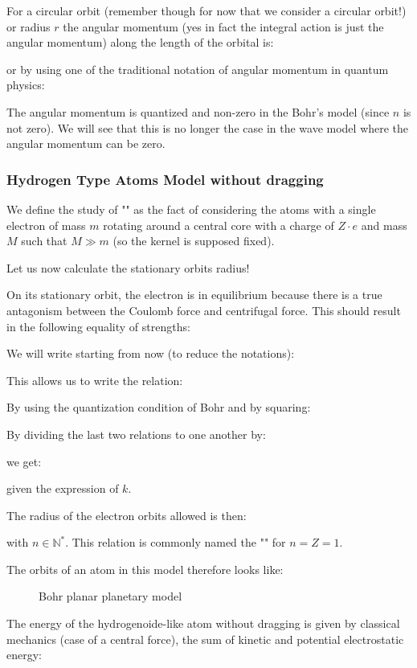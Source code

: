 For a circular orbit (remember though for now that we consider a circular orbit!) or radius $r$ the angular momentum (yes in fact the integral action is just the angular momentum) along the length of the orbital is:
	
or by using one of the traditional notation of angular momentum in quantum physics:
	
The angular momentum is quantized and non-zero in the Bohr's model (since $n$ is not zero). We will see that this is no longer the case in the wave model where the angular momentum can be zero.

	\subsubsection{Hydrogen Type Atoms Model without dragging}
	
	We define the study of "" as the fact of considering the atoms with a single electron of mass $m$ rotating around a central core with a charge of $Z \cdot e$ and mass $M$ such that $M \gg m$ (so the kernel is supposed fixed).
	
Let us now calculate the stationary orbits radius!

On its stationary orbit, the electron is in equilibrium because there is a true antagonism between the Coulomb force and centrifugal force. This should result in the following equality of strengths:
	
We will write starting from now (to reduce the notations):
	
This allows us to write the relation:
	
By using the quantization condition of Bohr and by squaring:
	
By dividing the last two relations to one another by:
	
we get:
		
given the expression of $k$.

The radius of the electron orbits allowed is then:
	
with $n \in \mathbb{N}^{*}$. This relation is commonly named the "" for $n=Z=1$.

The orbits of an atom in this model therefore looks like:

\begin{figure}[H]
\centering
{}
\caption{Bohr planar planetary model}
\end{figure}
The energy of the hydrogenoide-like atom without dragging is given by classical mechanics (case of a central force), the sum of kinetic and potential electrostatic energy:
	
